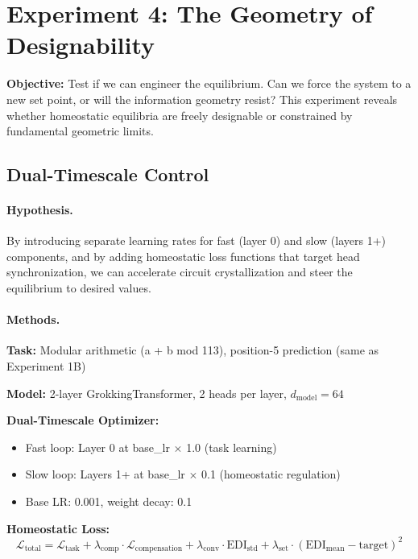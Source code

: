 \section{Experiment 4: The Geometry of Designability}\label{sec:exp4}

\textbf{Objective:} Test if we can engineer the equilibrium. Can we force the system to a new set point, or will the information geometry resist? This experiment reveals whether homeostatic equilibria are freely designable or constrained by fundamental geometric limits.

\subsection{Dual-Timescale Control}

\paragraph{Hypothesis.}
By introducing separate learning rates for fast (layer 0) and slow (layers 1+) components, and by adding homeostatic loss functions that target head synchronization, we can accelerate circuit crystallization and steer the equilibrium to desired values.

\paragraph{Methods.}
\textbf{Task:} Modular arithmetic (a + b mod 113), position-5 prediction (same as Experiment 1B)

\textbf{Model:} 2-layer GrokkingTransformer, 2 heads per layer, $d_{\text{model}}=64$

\textbf{Dual-Timescale Optimizer:}
\begin{itemize}
\item Fast loop: Layer 0 at base\_lr $\times$ 1.0 (task learning)
\item Slow loop: Layers 1+ at base\_lr $\times$ 0.1 (homeostatic regulation)
\item Base LR: 0.001, weight decay: 0.1
\end{itemize}

\textbf{Homeostatic Loss:}
\begin{equation}
\mathcal{L}_{\text{total}} = \mathcal{L}_{\text{task}} + \lambda_{\text{comp}} \cdot \mathcal{L}_{\text{compensation}} + \lambda_{\text{conv}} \cdot \text{EDI}_{\text{std}} + \lambda_{\text{set}} \cdot (\text{EDI}_{\text{mean}} - \text{target})^2
\end{equation}

